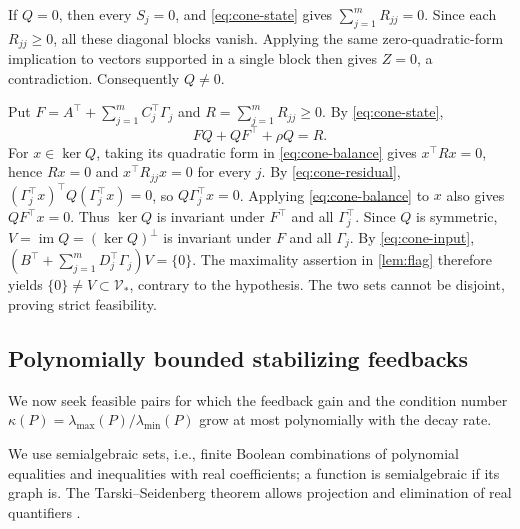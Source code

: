 \documentclass[twocolumn]{autart}
\begin{document}
\begin{pf}
If $Q=0$, then every $S_j=0$, and \cref{eq:cone-state} gives
$\sum\limits_{j=1}^mR_{jj}=0$. Since each $R_{jj}\geq0$, all these
diagonal blocks vanish. Applying the same zero-quadratic-form implication
to vectors supported in a single block then gives $Z=0$, a contradiction.
Consequently $Q\ne0$.

Put $F=A^\top+\sum\limits_{j=1}^mC_j^\top\Gamma_j$ and
$R=\sum\limits_{j=1}^mR_{jj}\geq0$. By \cref{eq:cone-state},
\begin{equation}\label{eq:cone-balance}
FQ+QF^\top+\rho Q=R.
\end{equation}
For $x\in\ker Q$, taking its quadratic form in \cref{eq:cone-balance}
gives $x^\top Rx=0$, hence $Rx=0$ and $x^\top R_{jj}x=0$ for every $j$.
By \cref{eq:cone-residual},
$(\Gamma_j^\top x)^\top Q(\Gamma_j^\top x)=0$, so
$Q\Gamma_j^\top x=0$.
Applying \cref{eq:cone-balance} to $x$ also gives $QF^\top x=0$.
Thus $\ker Q$ is invariant under $F^\top$ and all $\Gamma_j^\top$.
Since $Q$ is symmetric, $V=\operatorname{im}Q=(\ker Q)^\perp$ is
invariant under $F$ and all $\Gamma_j$.
By \cref{eq:cone-input},
$(B^\top+\sum\limits_{j=1}^mD_j^\top\Gamma_j)V=\{0\}$.
The maximality assertion in \cref{lem:flag} therefore yields
$\{0\}\ne V\subset\mathcal V_*$, contrary to the hypothesis.
The two sets cannot be disjoint, proving strict feasibility.
\end{pf}

\vspace{-3mm}

\subsection{Polynomially bounded stabilizing feedbacks}
\label{sec:feedback-growth}

We now seek feasible pairs for which the feedback gain and the condition
number $\kappa(P)=\lambda_{\max}(P)/\lambda_{\min}(P)$ grow at most
polynomially with the decay rate.

We use semialgebraic sets, i.e., finite Boolean combinations of polynomial equalities and inequalities with real coefficients; a function is semialgebraic if its graph is. The Tarski--Seidenberg theorem allows projection and elimination of real quantifiers \cite[Theorem~2.2.1 and Proposition~2.2.4]{BCR}.

\end{document}
